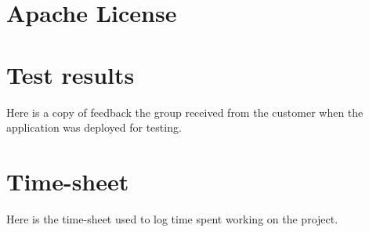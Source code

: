 \begin{appendices}




\chapter{Apache License}

\label{appendix:license}



\chapter{Test results}
Here is a copy of feedback the group received from the customer when the application was deployed for testing. 
\label{appendix:testResults}



\chapter{Time-sheet}
Here is the time-sheet used to log time spent working on the project.

\end{appendices}